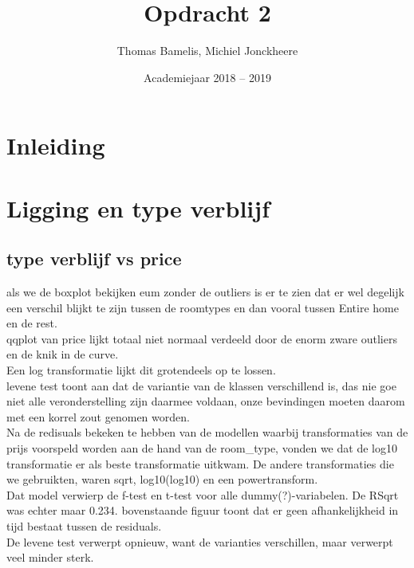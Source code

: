 \documentclass[a4paper,kulak]{kulakarticle} %
\date{Academiejaar 2018 -- 2019}
\title{Opdracht 2}
\author{Thomas Bamelis, Michiel Jonckheere}
\begin{document}
\maketitle

\section*{Inleiding}

\section{Ligging en type verblijf}
\subsection{type verblijf vs price}
als we de boxplot bekijken eum zonder de outliers is er te zien dat er wel degelijk een verschil blijkt te zijn tussen de roomtypes en dan vooral tussen Entire home en de rest. \\

qqplot van price lijkt totaal niet normaal verdeeld door de enorm zware outliers en de knik in de curve. \\

Een log transformatie lijkt dit grotendeels op te lossen. \\

levene test toont aan dat de variantie van de klassen verschillend is, das nie goe \\

niet alle veronderstelling zijn daarmee voldaan, onze bevindingen moeten daarom met een korrel zout genomen worden. \\

Na de redisuals bekeken te hebben van de modellen waarbij transformaties van de prijs voorspeld worden aan de hand van de room\_type, vonden we dat de log10 transformatie er als beste transformatie uitkwam. De andere transformaties die we gebruikten, waren sqrt, log10(log10) en een powertransform.\\

Dat model verwierp de f-test en t-test voor alle dummy(?)-variabelen. De RSqrt was echter maar 0.234.
bovenstaande figuur toont dat er geen afhankelijkheid in tijd bestaat tussen de residuals. \\

De levene test verwerpt opnieuw, want de varianties verschillen, maar verwerpt veel minder sterk.\\
\end{document}
